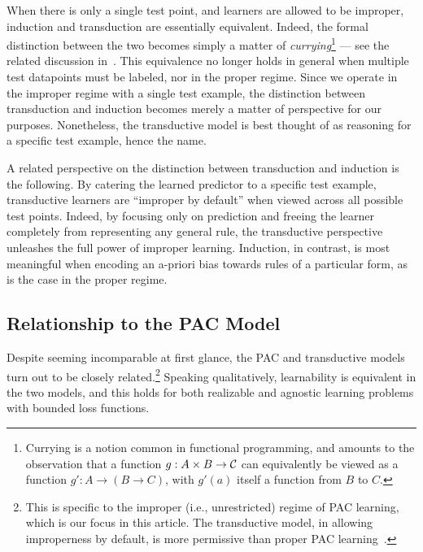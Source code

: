 When there is only a single test point, and learners are allowed to be improper, induction and transduction are essentially equivalent. Indeed,  the formal distinction between the two becomes simply a matter of \emph{currying}\footnote{Currying is a notion common in functional programming, and amounts to the observation that a function \linebreak $g: A \times B \to \mathcal{C}$ can equivalently be viewed as a function $g': A \to (B \to C)$, with $g'(a)$ itself a function from $B$ to $C$.}  --- see the related discussion in~\cite{montasser_transductive_2022}. This equivalence no longer holds in general when multiple test datapoints must be labeled, nor in the proper regime. Since we operate in the improper regime with a single test example, the distinction between transduction and induction becomes merely a matter of perspective for our purposes. Nonetheless, the  transductive model is best thought of as reasoning for a specific test example, hence the name.

A related perspective on the distinction between transduction and induction  is the following. By catering the learned predictor to a specific test example, transductive learners are ``improper by default'' when viewed across all possible test points. Indeed, by focusing only on prediction and freeing the learner completely from representing any general rule, the transductive perspective unleashes the full power of improper learning. Induction, in contrast, is most meaningful when encoding an a-priori bias towards rules of a particular form, as is the case in the proper regime.



\subsection{Relationship to the PAC Model}
\label{subsec:pac_trans}
Despite seeming  incomparable at first glance, the PAC and transductive models turn out to be closely related.\footnote{This is specific to the  improper (i.e., unrestricted) regime of PAC learning, which is our focus in this article. The transductive model, in allowing improperness by default, is more permissive than proper PAC learning~\cite{daniely_optimal_2014}.} Speaking qualitatively, learnability is equivalent in the two models, and this holds for both realizable and agnostic learning problems with bounded loss functions.

